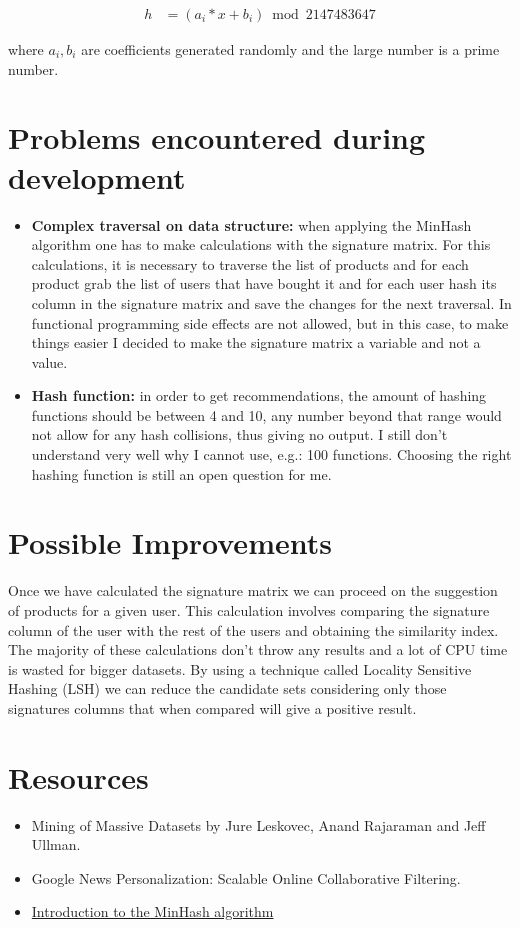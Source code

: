 \documentclass[paper=a4, fontsize=11pt]{scrartcl}
\numberwithin{equation}{section}		%
\numberwithin{figure}{section}			%
\numberwithin{table}{section}				%
\begin{document}
\begin{align} 
	h &= (a_i*x + b_i) \bmod 2147483647					
\end{align}

where ${a_i,b_i}$ are coefficients generated randomly and the large number is a prime number. 


\section{Problems encountered during development}

\begin{itemize}
\item \textbf{Complex traversal on data structure:} when applying the MinHash algorithm one has to make calculations with the signature matrix. 
For this calculations, it is necessary to traverse the list of products and for each product grab the list of users that have bought it and 
for each user hash its column in the signature matrix and save the changes for the next traversal. In functional programming side effects
are not allowed, but in this case, to make things easier I decided to make the signature matrix a variable and not a value. 
\item \textbf{Hash function:} in order to get recommendations, the amount of hashing functions should be between 4 and 10, any number 
beyond that range would not allow for any hash collisions, thus giving no output. I still don't understand very well why I cannot use, e.g.: 100 functions. 
Choosing the right hashing function is still an open question for me. 
\end{itemize}

\section{Possible Improvements}

Once we have calculated the signature matrix we can proceed on the suggestion of products for a given user. This calculation involves 
comparing the signature column of the user with the rest of the users and obtaining the similarity index. The majority of these calculations 
don't throw any results and a lot of CPU time is wasted for bigger datasets. By using a technique called Locality Sensitive Hashing (LSH) we can 
reduce the candidate sets considering only those signatures columns that when compared will give a positive result.

\section{Resources}

\begin{itemize}
\item Mining of Massive Datasets by Jure Leskovec, Anand Rajaraman and Jeff Ullman.
\item Google News Personalization: Scalable Online Collaborative Filtering.
\item \href{http://www.tonicebrian.com/2013/03/11/introduction-to-the-minhash-algorithm/}{Introduction to the MinHash algorithm}
\end{itemize}

\end{document}
